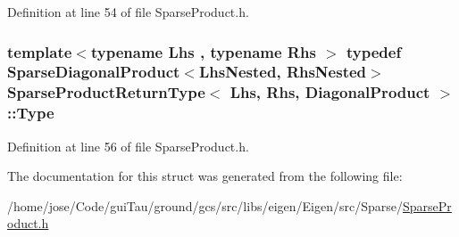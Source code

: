 Definition at line 54 of file Sparse\-Product.\-h.

\hypertarget{struct_sparse_product_return_type_3_01_lhs_00_01_rhs_00_01_diagonal_product_01_4_a656be86738827b9e30b7de5faeb93c79}{
\subsubsection[{Type}]{\setlength{\rightskip}{0pt plus 5cm}template$<$typename Lhs , typename Rhs $>$ typedef {\bf Sparse\-Diagonal\-Product}$<${\bf Lhs\-Nested}, {\bf Rhs\-Nested}$>$ {\bf Sparse\-Product\-Return\-Type}$<$ Lhs, Rhs, {\bf Diagonal\-Product} $>$\-::{\bf Type}}}\label{struct_sparse_product_return_type_3_01_lhs_00_01_rhs_00_01_diagonal_product_01_4_a656be86738827b9e30b7de5faeb93c79}


Definition at line 56 of file Sparse\-Product.\-h.



The documentation for this struct was generated from the following file\-:\begin{DoxyCompactItemize}
\item 
/home/jose/\-Code/gui\-Tau/ground/gcs/src/libs/eigen/\-Eigen/src/\-Sparse/\hyperlink{_sparse_product_8h}{Sparse\-Product.\-h}\end{DoxyCompactItemize}
